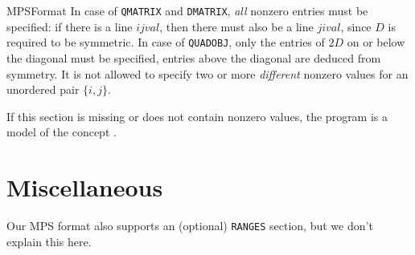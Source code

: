 \begin{ccRefConcept}{MPSFormat}
In case of \texttt{QMATRIX} and \texttt{DMATRIX}, \emph{all} nonzero
entries must be specified: if there is a line $i j val$, then there
must also be a line $j i val$, since $D$ is required to be symmetric.
In case of \texttt{QUADOBJ}, only the entries of $2D$ on or below the 
diagonal must be specified, entries above the diagonal are deduced from 
symmetry. It is not allowed to specify two or more \emph{different} 
nonzero values for an unordered pair $\{i,j\}$.

If this section is missing or does not contain nonzero values, the
program is a model of the concept .

\section*{Miscellaneous}
Our MPS format also supports an (optional) \texttt{RANGES} section,
but we don't explain this here.

\ccSeeAlso


\end{ccRefConcept}
